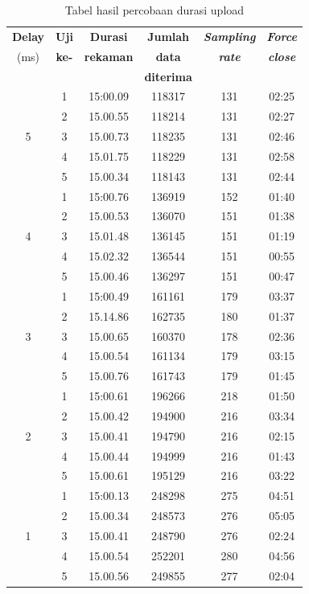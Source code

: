 \begin{table}[H]
	\caption{Tabel hasil percobaan durasi upload}
	\begin{tabular}{|c|c|c|c|c|c|}
		\hline
		\multicolumn{1}{|c|}{{\color[HTML]{000000} \textbf{Delay}}} & \multicolumn{1}{|c|}{\textbf{Uji}} &
		\multicolumn{1}{|c|}{ \textbf{Durasi}} &
		\multicolumn{1}{|c|}{\textbf{Jumlah}} &
		\multicolumn{1}{|c|}{\textbf{\textit{Sampling}}}  & 
		\multicolumn{1}{|c|}{\textbf{\textit{Force}}} \\
		(ms) &  \textbf{ke-}  & \textbf{rekaman}  & \textbf{data} & \textbf{\textit{rate}}  & \textit{\textbf{close}}\\
		&  &  &  \textbf{diterima} & &  \\ \hline
		
		\multirow{5}{*}{5} &1& 15:00.09 &118317 &131 & 02:25 \\
		\cline{2-6}&2 &15.00.55 & 118214 &131 & 02:27\\ 
		\cline{2-6}&3 &15.00.73 & 118235 &131 & 02:46\\ 
		\cline{2-6}&4 &15.01.75 & 118229 &131 & 02:58\\ 
		\cline{2-6}&5 &15.00.34 & 118143 &131 & 02:44\\ 
		\hline
		\multirow{5}{*}{4} &1& 15:00.76 &136919 &152 & 01:40 \\
		\cline{2-6}&2 &15.00.53 & 136070 &151 & 01:38\\ 
		\cline{2-6}&3 &15.01.48 & 136145 &151 & 01:19\\ 
		\cline{2-6}&4 &15.02.32 & 136544 &151 & 00:55\\ 
		\cline{2-6}&5 &15.00.46 & 136297 &151 & 00:47\\ 
		\hline
		\multirow{5}{*}{3} &1& 15:00.49 &161161 &179 & 03:37 \\
		\cline{2-6}&2 &15.14.86 & 162735 &180 & 01:37\\ 
		\cline{2-6}&3 &15.00.65 & 160370 &178 & 02:36\\ 
		\cline{2-6}&4 &15.00.54 & 161134 &179 & 03:15\\ 
		\cline{2-6}&5 &15.00.76 & 161743 &179 & 01:45\\ 
		\hline
		\multirow{5}{*}{2} &1& 15:00.61 &196266 &218 & 01:50 \\
		\cline{2-6}&2 &15.00.42 & 194900 &216 & 03:34\\ 
		\cline{2-6}&3 &15.00.41 & 194790 &216 & 02:15\\ 
		\cline{2-6}&4 &15.00.44 & 194999 &216 & 01:43\\ 
		\cline{2-6}&5 &15.00.61 & 195129 &216 & 03:22\\ 
		\hline
		\multirow{5}{*}{1} &1& 15:00.13 &248298 &275 & 04:51 \\
		\cline{2-6}&2 &15.00.34 & 248573 &276 & 05:05\\ 
		\cline{2-6}&3 &15.00.41 & 248790 &276 & 02:24\\ 
		\cline{2-6}&4 &15.00.54 & 252201 &280 & 04:56\\ 
		\cline{2-6}&5 &15.00.56 & 249855 &277 & 02:04\\ 
		\hline
	\end{tabular}
	\vspace{1ex}
	

\end{table}
